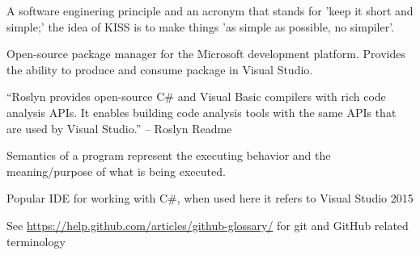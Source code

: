 \documentclass[draftclsnofoot,onecolumn]{IEEEtran}
\begin{document}
\begin{description}
\item[KISS:] A software enginering principle and an acronym that stands for 
'keep it short and simple;' the idea of KISS is to make things 'as simple as 
possible, no simpiler'.

\item[NuGet Package:] Open-source package manager for the Microsoft 
development platform. Provides the ability to produce and consume package in 
Visual Studio.

\item[Roslyn:] “Roslyn provides open-source C\# and Visual Basic compilers 
with rich code analysis APIs. It enables building code analysis tools with 
the same APIs that are used by Visual Studio.” – Roslyn Readme 

\item[Semantics:] Semantics of a program represent the executing behavior and 
the meaning/purpose of what is being executed. 

\item[VS:] Popular IDE for working with C\#, when used here it refers to 
Visual Studio 2015

\end{description}

See \url{https://help.github.com/articles/github-glossary/} for git and 
GitHub related terminology
\end{document}
